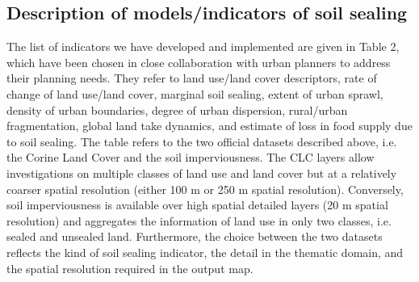\documentclass[APA,LATO1COL,doublespace]{WileyNJD-v2}
\begin{document}
\subsection{Description of models/indicators of soil sealing}
The list of indicators we have developed and implemented are given in Table 2, which have been chosen in close collaboration with urban planners to address their planning needs. 
They refer to land use/land cover descriptors, rate of change of land use/land cover, marginal soil sealing, extent of urban sprawl, density of urban boundaries, degree of urban dispersion, rural/urban fragmentation, global land take dynamics, and estimate of loss in food supply due to soil sealing. 
The table refers to the two official datasets described above, i.e. the Corine Land Cover and the soil imperviousness. 
The CLC layers allow investigations on multiple classes of land use and land cover but at a relatively coarser spatial resolution (either 100 m or 250 m spatial resolution).
Conversely, soil imperviousness is available over high spatial detailed layers (20 m spatial resolution) and aggregates the information of land use in only two classes, i.e. sealed and unsealed land. 
Furthermore, the choice between the two datasets reflects the kind of soil sealing indicator, the detail in the thematic domain, and the spatial resolution required in the output map. 
\end{document}
